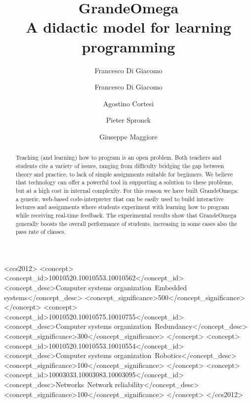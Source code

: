 \documentclass[sigconf]{acmart}
\begin{document}
\title{GrandeOmega \\ A didactic model for learning programming}

\author{Francesco Di Giacomo}

\author{Francesco Di Giacomo}

\author{Agostino Cortesi}

\author{Pieter Spronck}

\author{Giuseppe Maggiore}


\renewcommand{\shortauthors}{F. Di Giacomo et al.}


\begin{abstract}
	Teaching (and learning) how to program is an open problem. Both teachers and students cite a variety of issues, ranging from difficulty bridging the gap between theory and practice, to lack of simple assignments suitable for beginners.
	We believe that technology can offer a powerful tool in supporting a solution to these problems, but at a high cost in internal complexity. For this reason we have built GrandeOmega: a generic, web-based code-interpreter that can be easily used to build interactive lectures and assignments where students experiment with learning how to program while receiving real-time feedback. The experimental results show that GrandeOmega generally boosts the overall performance of students, increasing in some cases also the pass rate of classes.
\end{abstract}

%
%
\begin{CCSXML}
<ccs2012>
 <concept>
  <concept_id>10010520.10010553.10010562</concept_id>
  <concept_desc>Computer systems organization~Embedded systems</concept_desc>
  <concept_significance>500</concept_significance>
 </concept>
 <concept>
  <concept_id>10010520.10010575.10010755</concept_id>
  <concept_desc>Computer systems organization~Redundancy</concept_desc>
  <concept_significance>300</concept_significance>
 </concept>
 <concept>
  <concept_id>10010520.10010553.10010554</concept_id>
  <concept_desc>Computer systems organization~Robotics</concept_desc>
  <concept_significance>100</concept_significance>
 </concept>
 <concept>
  <concept_id>10003033.10003083.10003095</concept_id>
  <concept_desc>Networks~Network reliability</concept_desc>
  <concept_significance>100</concept_significance>
 </concept>
</ccs2012>  
\end{CCSXML}
\end{document}
